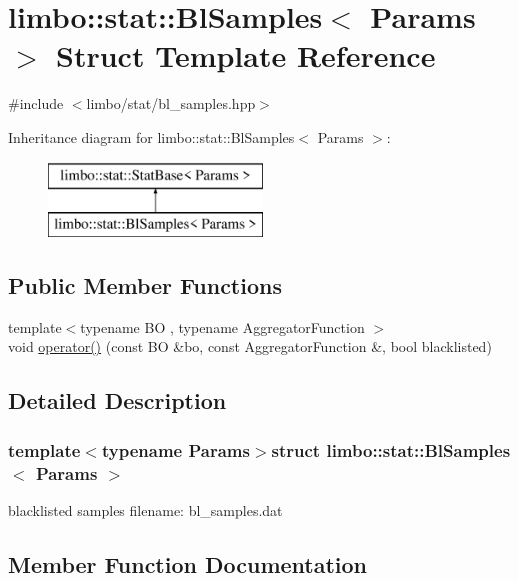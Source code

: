\hypertarget{structlimbo_1_1stat_1_1_bl_samples}{}\section{limbo\+:\+:stat\+:\+:Bl\+Samples$<$ Params $>$ Struct Template Reference}
\label{structlimbo_1_1stat_1_1_bl_samples}


{\ttfamily \#include $<$limbo/stat/bl\+\_\+samples.\+hpp$>$}

Inheritance diagram for limbo\+:\+:stat\+:\+:Bl\+Samples$<$ Params $>$\+:\begin{figure}[H]
\begin{center}
\leavevmode
\includegraphics[height=2.000000cm]{structlimbo_1_1stat_1_1_bl_samples}
\end{center}
\end{figure}
\subsection*{Public Member Functions}
\begin{DoxyCompactItemize}
\item 
{\footnotesize template$<$typename B\+O , typename Aggregator\+Function $>$ }\\void \hyperlink{structlimbo_1_1stat_1_1_bl_samples_a1671492ad1724364555d5b042cd81d15}{operator()} (const B\+O \&bo, const Aggregator\+Function \&, bool blacklisted)
\end{DoxyCompactItemize}


\subsection{Detailed Description}
\subsubsection*{template$<$typename Params$>$struct limbo\+::stat\+::\+Bl\+Samples$<$ Params $>$}

blacklisted samples filename\+: {\ttfamily bl\+\_\+samples.\+dat} 

\subsection{Member Function Documentation}
\hypertarget{structlimbo_1_1stat_1_1_bl_samples_a1671492ad1724364555d5b042cd81d15}{}
